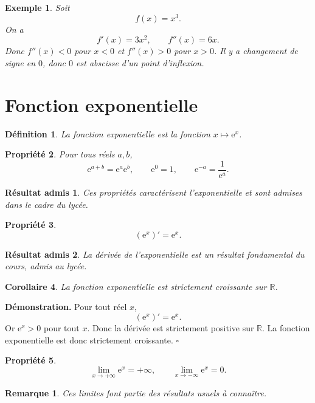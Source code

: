 \documentclass[11pt,a4paper]{article}
\newtheorem{definition}{Définition}[section]
\newtheorem{propriete}[definition]{Propriété}
\newtheorem{corollaire}[definition]{Corollaire}
\newtheorem*{exemple}{Exemple}
\newtheorem*{remarque}{Remarque}
\newtheorem*{admis}{Résultat admis}
\newcommand{\R}{\mathbb{R}}
\newcommand{\e}{\mathrm{e}}
\begin{document}
\begin{exemple}
Soit
\[
f(x)=x^3.
\]
On a
\[
f'(x)=3x^2,\qquad f''(x)=6x.
\]
Donc \(f''(x)<0\) pour \(x<0\) et \(f''(x)>0\) pour \(x>0\). Il y a changement de signe en \(0\), donc \(0\) est abscisse d'un point d'inflexion.
\end{exemple}

\section{Fonction exponentielle}

\begin{definition}
La fonction exponentielle est la fonction \(x\mapsto \e^x\).
\end{definition}

\begin{propriete}
Pour tous réels \(a,b\),
\[
\e^{a+b}=\e^a\e^b,\qquad \e^0=1,\qquad \e^{-a}=\frac1{\e^a}.
\]
\end{propriete}

\begin{admis}
Ces propriétés caractérisent l'exponentielle et sont admises dans le cadre du lycée.
\end{admis}

\begin{propriete}
\[
(\e^x)'=\e^x.
\]
\end{propriete}

\begin{admis}
La dérivée de l'exponentielle est un résultat fondamental du cours, admis au lycée.
\end{admis}

\begin{corollaire}
La fonction exponentielle est strictement croissante sur \(\R\).
\end{corollaire}

\textbf{Démonstration.}  
Pour tout réel \(x\),
\[
(\e^x)'=\e^x.
\]
Or \(\e^x>0\) pour tout \(x\). Donc la dérivée est strictement positive sur \(\R\). La fonction exponentielle est donc strictement croissante. \(\square\)

\begin{propriete}
\[
\lim_{x\to +\infty}\e^x=+\infty,\qquad \lim_{x\to -\infty}\e^x=0.
\]
\end{propriete}

\begin{remarque}
Ces limites font partie des résultats usuels à connaître.
\end{remarque}
\end{document}
